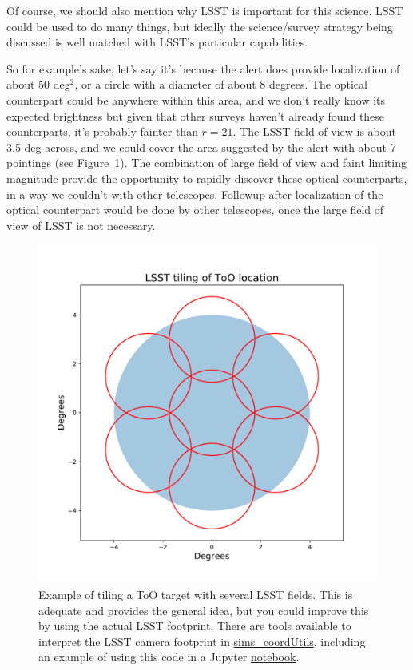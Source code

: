 \documentclass[11pt]{article}
\begin{document}
Of course, we should also mention why LSST is important for this science. LSST could be used 
to do many things, but ideally the science/survey strategy being discussed is well matched with LSST's particular
capabilities. 

So for example's sake, let's say it's because the alert does provide localization of about 50 deg$^2$, or a circle with 
a diameter of about 8 degrees. The optical counterpart could be anywhere within this area, and we don't really know its
expected brightness but given that other surveys haven't already found these counterparts, it's probably fainter than $r=21$. 
The LSST field of view is about 3.5 deg across, and we could cover the area suggested by the alert with about 7 pointings
(see Figure~\ref{fig:tiling}).  The combination of large field of view and faint limiting magnitude provide the opportunity
to rapidly discover these optical counterparts, in a way we couldn't with other telescopes. 
Followup after localization of the optical counterpart would be done by other telescopes, once the large field of view
of LSST is not necessary.


\begin{figure}
\includegraphics[width=1.1\textwidth]{ToO_tiling}
\caption{Example of tiling a ToO target with several LSST fields.  This is adequate and provides the general idea, but you could improve this 
by using the actual LSST footprint. There are tools available to interpret the LSST camera footprint in 
\href{https://github.com/lsst/sims_coordUtils}{sims\_coordUtils}, 
including an example of using this code in a Jupyter 
\href{https://github.com/lsst/sims_coordUtils/blob/master/examples/CameraUtilsExample.ipynb}{notebook}.
 \label{fig:tiling}}
\end{figure}
\end{document}
